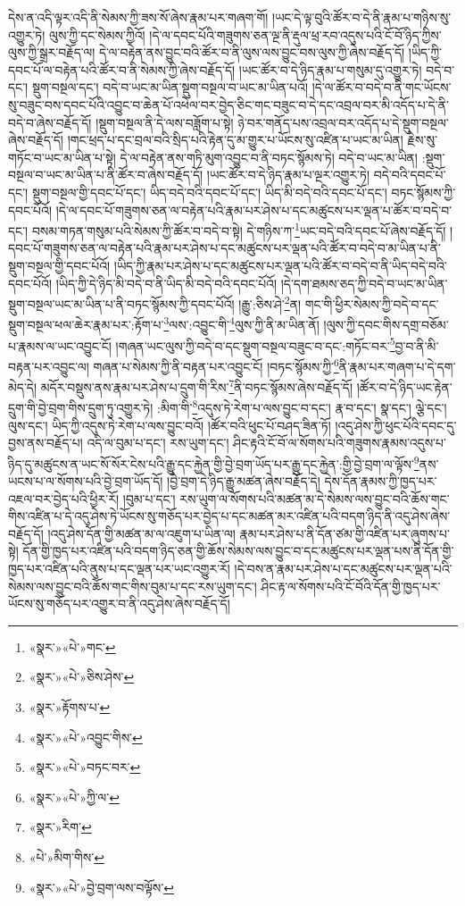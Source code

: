 དེས་ན་འདི་ལྟར་འདི་ནི་སེམས་ཀྱི་ཟས་སོ་ཞེས་རྣམ་པར་གཞག་གོ། །ཡང་དེ་ལྟ་བུའི་ཚོར་བ་དེ་ནི་རྣམ་པ་གཉིས་སུ་འགྱུར་ཏེ། ལུས་ཀྱི་དང་སེམས་ཀྱིའོ། །དེ་ལ་དབང་པོའི་གཟུགས་ཅན་ལྔ་ནི་རྡུལ་ཕྲ་རབ་འདུས་པའི་ངོ་བོ་ཉིད་ཀྱིས་ལུས་ཀྱི་སྒྲར་བརྗོད་ལ། དེ་ལ་བརྟེན་ནས་བྱུང་བའི་ཚོར་བ་ནི་ལུས་ལས་བྱུང་བས་ལུས་ཀྱི་ཞེས་བརྗོད་དོ། །ཡིད་ཀྱི་དབང་པོ་ལ་བརྟེན་པའི་ཚོར་བ་ནི་སེམས་ཀྱི་ཞེས་བརྗོད་དོ། །ཡང་ཚོར་བ་དེ་ཉིད་རྣམ་པ་གསུམ་དུ་འགྱུར་ཏེ། བདེ་བ་དང་། སྡུག་བསྔལ་དང་། བདེ་བ་ཡང་མ་ཡིན་སྡུག་བསྔལ་བ་ཡང་མ་ཡིན་པའོ། །དེ་ལ་ཚོར་བ་བདེ་བ་ནི་གང་ཡོངས་སུ་བཟུང་བས་དབང་པོའི་འབྱུང་བ་ཆེན་པོ་འཕེལ་བར་བྱེད་ཅིང་གང་བཟུང་བ་དེ་དང་འབྲལ་བར་མི་འདོད་པ་དེ་ནི་བདེ་བ་ཞེས་བརྗོད་དོ། །སྡུག་བསྔལ་ནི་དེ་ལས་བཟློག་པ་སྟེ། ཉེ་བར་གནོད་པས་འབྲལ་བར་འདོད་པ་དེ་སྡུག་བསྔལ་ཞེས་བརྗོད་དོ། །གང་ཕྲད་པ་དང་བྲལ་བའི་སྲིད་པའི་རྟེན་དུ་མ་གྱུར་པ་ཡོངས་སུ་འཛིན་པ་ཡང་མ་ཡིན། རྗེས་སུ་གཏོང་བ་ཡང་མ་ཡིན་པ་སྟེ། དེ་ལ་བརྟེན་ནས་གཏི་མུག་འབྱུང་བ་ནི་བཏང་སྙོམས་ཏེ། བདེ་བ་ཡང་མ་ཡིན། :སྡུག་བསྔལ་བ་ཡང་མ་ཡིན་པ་ནི་ཚོར་བ་ཞེས་བརྗོད་དོ། །ཡང་ཚོར་བ་དེ་ཉིད་རྣམ་པ་ལྔར་འགྱུར་ཏེ། བདེ་བའི་དབང་པོ་དང་། སྡུག་བསྔལ་གྱི་དབང་པོ་དང་། ཡིད་བདེ་བའི་དབང་པོ་དང་། ཡིད་མི་བདེ་བའི་དབང་པོ་དང་། བཏང་སྙོམས་ཀྱི་དབང་པོའོ། །དེ་ལ་དབང་པོ་གཟུགས་ཅན་ལ་བརྟེན་པའི་རྣམ་པར་ཤེས་པ་དང་མཚུངས་པར་ལྡན་པ་ཚོར་བ་བདེ་བ་དང་། བསམ་གཏན་གསུམ་པའི་སེམས་ཀྱི་ཚོར་བ་བདེ་བ་སྟེ། དེ་གཉིས་ཀ་\footnote{«སྣར་»«པེ་»གང་}ཡང་བདེ་བའི་དབང་པོ་ཞེས་བརྗོད་དོ། །དབང་པོ་གཟུགས་ཅན་ལ་བརྟེན་པའི་རྣམ་པར་ཤེས་པ་དང་མཚུངས་པར་ལྡན་པའི་ཚོར་བ་བདེ་བ་མ་ཡིན་པ་ནི་སྡུག་བསྔལ་གྱི་དབང་པོའོ། །ཡིད་ཀྱི་རྣམ་པར་ཤེས་པ་དང་མཚུངས་པར་ལྡན་པའི་ཚོར་བ་བདེ་བ་ནི་ཡིད་བདེ་བའི་དབང་པོའོ། །ཡིད་ཀྱི་དེ་ཉིད་མི་བདེ་བ་ནི་ཡིད་མི་བདེ་བའི་དབང་པོའོ། །དེ་དག་ཐམས་ཅད་ཀྱི་བདེ་བ་ཡང་མ་ཡིན་སྡུག་བསྔལ་ཡང་མ་ཡིན་པ་ནི་བཏང་སྙོམས་ཀྱི་དབང་པོའོ། །རྒྱུ་:ཅིས་ཤེ་\footnote{«སྣར་»«པེ་»ཅིས་ཤེས་}ན། གང་གི་ཕྱིར་སེམས་ཀྱི་བདེ་བ་དང་སྡུག་བསྔལ་ཕལ་ཆེར་རྣམ་པར་:རྟོག་པ་\footnote{«སྣར་»རྟོགས་པ་}ལས་:འབྱུང་གི་\footnote{«སྣར་»«པེ་»འབྱུང་གིས་}ལུས་ཀྱི་ནི་མ་ཡིན་ནོ། །ལུས་ཀྱི་དབང་གིས་དགྲ་བཅོམ་པ་རྣམས་ལ་ཡང་འབྱུང་ངོ། །གཞན་ཡང་ལུས་ཀྱི་བདེ་བ་དང་སྡུག་བསྔལ་བཟུང་བ་དང་:གཏོང་བར་\footnote{«སྣར་»«པེ་»བཏང་བར་}བྱ་བ་ནི་མི་བརྟན་པར་འབྱུང་ལ། གཞན་པ་སེམས་ཀྱི་ནི་བརྟན་པར་འབྱུང་ངོ། །བཏང་སྙོམས་ཀྱི་\footnote{«སྣར་»«པེ་»ཀྱི་ལ་}ནི་རྣམ་པར་གཞག་པ་དེ་དག་མེད་དེ། མདོར་བསྡུས་ནས་རྣམ་པར་ཤེས་པ་དྲུག་གི་རིས་\footnote{«སྣར་»རིག་}ནི་བཏང་སྙོམས་ཞེས་བརྗོད་དོ། །ཚོར་བ་དེ་ཉིད་ཡང་རྟེན་དྲུག་གི་བྱེ་བྲག་གིས་དྲུག་ཏུ་འགྱུར་ཏེ། :མིག་གི་\footnote{«པེ་»མིག་གིས་}འདུས་ཏེ་རེག་པ་ལས་བྱུང་བ་དང་། རྣ་བ་དང་། སྣ་དང་། ལྕེ་དང་། ལུས་དང་། ཡིད་ཀྱི་འདུས་ཏེ་རེག་པ་ལས་བྱུང་བའོ། །ཚོར་བའི་ཕུང་པོ་བཤད་ཟིན་ཏོ། །འདུ་ཤེས་ཀྱི་ཕུང་པོའི་དབང་དུ་བྱས་ནས་བརྗོད་པ། འདི་ལ་བུམ་པ་དང་། རས་ཡུག་དང་། ཤིང་རྟའི་ངོ་བོ་ལ་སོགས་པའི་གཟུགས་རྣམས་འདུས་པ་ཉིད་དུ་མཚུངས་ན་ཡང་སོ་སོར་ངེས་པའི་རྒྱུ་དང་རྐྱེན་གྱི་བྱེ་བྲག་ཡོད་པར་རྒྱུ་དང་རྐྱེན་:གྱི་བྱེ་བྲག་ལ་ལྟོས་\footnote{«སྣར་»«པེ་»བྱེ་བྲག་ལས་བལྟོས་}ནས་ཡངས་པ་ལ་སོགས་པའི་བྱེ་བྲག་ཡོད་དོ། །བྱེ་བྲག་དེ་ཉིད་རྒྱུ་མཚན་ཞེས་བརྗོད་དེ། དེས་དོན་རྣམས་ཀྱི་ཁྱད་པར་འཇལ་བར་བྱེད་པའི་ཕྱིར་རོ། །བུམ་པ་དང་། རས་ཡུག་ལ་སོགས་པའི་མཚན་མ་དེ་སེམས་ལས་བྱུང་བའི་ཆོས་གང་གིས་འཛིན་པ་དེ་འདུ་ཤེས་ཏེ་ཡོངས་སུ་གཅོད་པར་བྱེད་པ་དང་མཚན་མར་འཛིན་པའི་བདག་ཉིད་ནི་འདུ་ཤེས་ཞེས་བརྗོད་དོ། །འདུ་ཤེས་དོན་གྱི་མཚན་མ་ལ་འཇུག་པ་ཡིན་ལ། རྣམ་པར་ཤེས་པ་ནི་དོན་ཙམ་གྱི་འཛིན་པར་ཞུགས་པ་སྟེ། དོན་གྱི་ཁྱད་པར་འཛིན་པའི་བདག་ཉིད་ཅན་གྱི་ཆོས་སེམས་ལས་བྱུང་བ་དང་མཚུངས་པར་ལྡན་པས་ནི་དོན་གྱི་ཁྱད་པར་འཛིན་པའི་ནུས་པ་དང་ལྡན་པར་ཡང་འགྱུར་རོ། །དེ་བས་ན་རྣམ་པར་ཤེས་པ་དང་མཚུངས་པར་ལྡན་པའི་སེམས་ལས་བྱུང་བའི་ཆོས་གང་གིས་བུམ་པ་དང་རས་ཡུག་དང་། ཤིང་རྟ་ལ་སོགས་པའི་ངོ་བོའི་དོན་གྱི་ཁྱད་པར་ཡོངས་སུ་གཅོད་པར་འགྱུར་བ་ནི་འདུ་ཤེས་ཞེས་བརྗོད་དོ། 